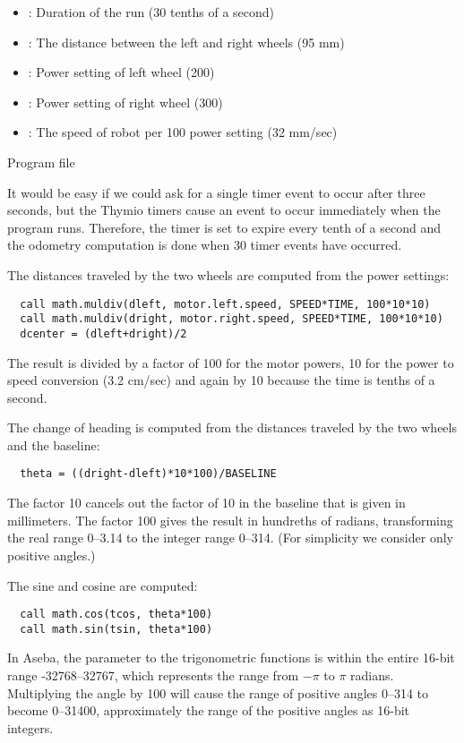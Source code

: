 
\begin{itemize}
\item {}: Duration of the run (30 tenths of a second)
\item {}: The distance between the left and right wheels (95 mm)
\item {}: Power setting of left wheel (200)
\item {}: Power setting of right wheel (300)
\item {}: The speed of robot per 100 power setting (32 mm/sec)
\end{itemize}


{\raggedleft \hfill Program file }

It would be easy if we could ask for a single timer event to occur
after three seconds, but the Thymio timers cause an event to occur
immediately when the program runs.
Therefore, the timer is set to expire every tenth of a second and the
odometry computation is done when 30 timer events have occurred.

The distances traveled by the two wheels are computed from the power settings:
\begin{verbatim}
  call math.muldiv(dleft, motor.left.speed, SPEED*TIME, 100*10*10)
  call math.muldiv(dright, motor.right.speed, SPEED*TIME, 100*10*10)
  dcenter = (dleft+dright)/2
\end{verbatim}
The result is divided by a factor of 100 for the motor powers,
10 for the power to speed conversion (3.2 cm/sec) and again by 10
because the time is tenths of a second.

The change of heading is computed from the distances traveled by the two wheels
and the baseline:
\begin{verbatim}
  theta = ((dright-dleft)*10*100)/BASELINE
\end{verbatim}
The factor 10 cancels out the factor of 10 in the baseline that
is given in millimeters.
The factor 100 gives the result in hundreths of radians,
transforming the real range 0--3.14 to the integer range 0--314.
(For simplicity we consider only positive angles.)

The sine and cosine are computed:
\begin{verbatim}
  call math.cos(tcos, theta*100)
  call math.sin(tsin, theta*100)
\end{verbatim}
In Aseba, the parameter to the trigonometric functions is within
the entire 16-bit range -32768--32767, which represents the range
from $-\pi$ to $\pi$ radians.
Multiplying the angle by 100 will cause the range of positive
angles 0--314 to become 0--31400, approximately the range
of the positive angles as 16-bit integers.

